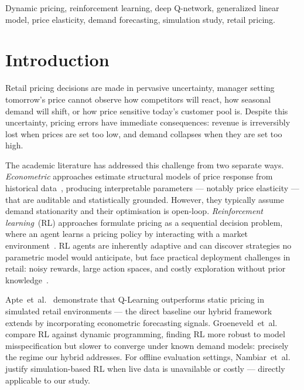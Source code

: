 \documentclass[journal, 10pt, twoside]{IEEEtran}
\begin{document}
\begin{IEEEkeywords}
Dynamic pricing, reinforcement learning, deep Q-network, generalized linear
model, price elasticity, demand forecasting, simulation study, retail
pricing.
\end{IEEEkeywords}

\section{Introduction}
\label{sec:intro}

Retail pricing decisions are made in pervasive uncertainty, manager
setting tomorrow's price cannot observe how competitors will react, how
seasonal demand will shift, or how price sensitive today's customer pool
is. Despite this uncertainty, pricing errors have immediate consequences:
revenue is irreversibly lost when prices are set too low, and demand
collapses when they are set too high.

The academic literature has addressed this challenge from two separate
ways. \textit{Econometric} approaches estimate structural models of
price response from historical data~\cite{kopalle2023}, producing
interpretable parameters --- notably price elasticity --- that are
auditable and statistically grounded. However, they typically assume
demand stationarity and their optimisation is open-loop. \textit{Reinforcement
learning}~(RL) approaches formulate pricing as a sequential decision
problem, where an agent learns a pricing policy by interacting with a
market environment~\cite{groeneveld2025, razumovskiy2025}. RL agents are
inherently adaptive and can discover strategies no parametric model
would anticipate, but face practical deployment challenges in retail: noisy
rewards, large action spaces, and costly exploration without prior
knowledge~\cite{apte2024, cheung2023}.

Apte~et~al.~\cite{apte2024} demonstrate that Q-Learning outperforms
static pricing in simulated retail environments --- the direct baseline
our hybrid framework extends by incorporating econometric forecasting
signals. Groeneveld~et~al.~\cite{groeneveld2025} compare RL against
dynamic programming, finding RL more robust to model misspecification but
slower to converge under known demand models: precisely the regime our
hybrid addresses. For offline evaluation settings, Nambiar~et~al.
\cite{nambiar2022} justify simulation-based RL when live data is
unavailable or costly --- directly applicable to our study.
\end{document}
